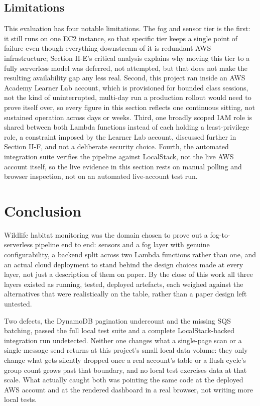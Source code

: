 \documentclass[conference,a4paper]{IEEEtran}
\begin{document}
\subsection{Limitations}

This evaluation has four notable limitations. The fog and sensor tier is the first: it still runs on one EC2 instance, so that specific tier keeps a single point of failure even though everything downstream of it is redundant AWS infrastructure; Section II-E's critical analysis explains why moving this tier to a fully serverless model was deferred, not attempted, but that does not make the resulting availability gap any less real. Second, this project ran inside an AWS Academy Learner Lab account, which is provisioned for bounded class sessions, not the kind of uninterrupted, multi-day run a production rollout would need to prove itself over, so every figure in this section reflects one continuous sitting, not sustained operation across days or weeks. Third, one broadly scoped IAM role is shared between both Lambda functions instead of each holding a least-privilege role, a constraint imposed by the Learner Lab account, discussed further in Section II-F, and not a deliberate security choice. Fourth, the automated integration suite verifies the pipeline against LocalStack, not the live AWS account itself, so the live evidence in this section rests on manual polling and browser inspection, not on an automated live-account test run.

\section{Conclusion}

Wildlife habitat monitoring was the domain chosen to prove out a fog-to-serverless pipeline end to end: sensors and a fog layer with genuine configurability, a backend split across two Lambda functions rather than one, and an actual cloud deployment to stand behind the design choices made at every layer, not just a description of them on paper. By the close of this work all three layers existed as running, tested, deployed artefacts, each weighed against the alternatives that were realistically on the table, rather than a paper design left untested.

Two defects, the DynamoDB pagination undercount and the missing SQS batching, passed the full local test suite and a complete LocalStack-backed integration run undetected. Neither one changes what a single-page scan or a single-message send returns at this project's small local data volume: they only change what gets silently dropped once a real account's table or a flush cycle's group count grows past that boundary, and no local test exercises data at that scale. What actually caught both was pointing the same code at the deployed AWS account and at the rendered dashboard in a real browser, not writing more local tests.
\end{document}
